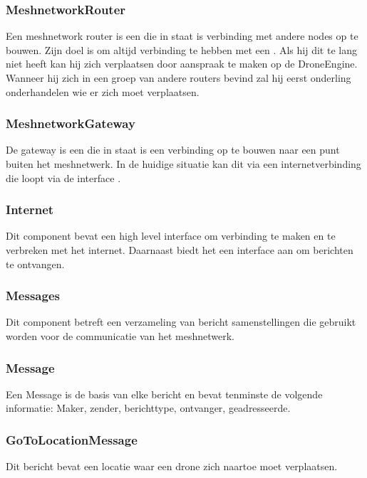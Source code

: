 \documentclass[a4paper, 11pt, oneside]{report}
\begin{document}
\subsubsection{MeshnetworkRouter}
\label{architectural:subcomponenten:MeshnetworkRouter}
Een meshnetwork router is een  die in staat is verbinding met andere nodes op te bouwen.
Zijn doel is om altijd verbinding te hebben met een .
Als hij dit te lang niet heeft kan hij zich verplaatsen door aanspraak te maken op de DroneEngine.
Wanneer hij zich in een groep van andere routers bevind zal hij eerst onderling onderhandelen wie er zich moet verplaatsen.

\subsubsection{MeshnetworkGateway}
\label{architectural:subcomponenten:MeshnetworkGateway}
De gateway is een  die in staat is een verbinding op te bouwen naar een punt buiten het meshnetwerk. In de huidige situatie kan dit via een internetverbinding die loopt via de interface . 

\subsubsection{Internet}
\label{architectural:subcomponenten:Internet}
Dit component bevat een high level interface om verbinding te maken en te verbreken met het internet.
Daarnaast biedt het een interface aan om berichten te ontvangen.

\subsubsection{Messages}
\label{architectural:subcomponenten:Messages}
Dit component betreft een verzameling van bericht samenstellingen die gebruikt worden voor de communicatie van het meshnetwerk.

\subsubsection{Message}
\label{architectural:subcomponenten:Message}
Een Message is de basis van elke bericht en bevat tenminste de volgende informatie:  Maker, zender, berichttype, ontvanger, geadresseerde. 
\subsubsection{GoToLocationMessage}
\label{architectural:subcomponenten:GoToLocationMessage}
Dit bericht bevat een locatie waar een drone zich naartoe moet verplaatsen.
\end{document}
